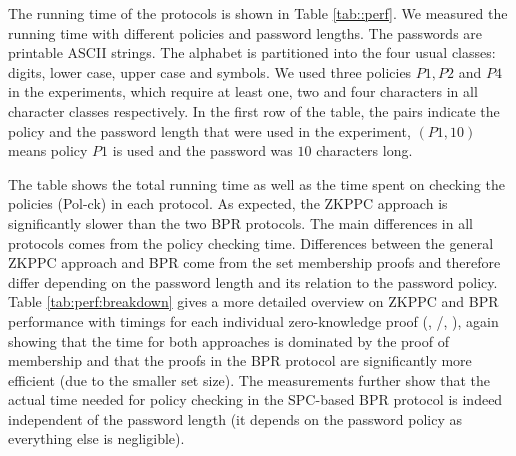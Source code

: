 \begin{table}[!t]
\begin{center}
\vspace*{1em}
\caption[BPR Protocol Performance]{Protocol Performance (Running Time in Milliseconds)} \label{tab::perf}
\end{center}
\end{table} 

The running time of the protocols is shown in Table \ref{tab::perf}. We measured the running time with different policies and password lengths. The passwords are printable \ac{ASCII} strings. 
The alphabet is partitioned into the four usual classes: digits, lower case, upper case and symbols. 
We used three policies $P1, P2$ and $P4$ in the experiments, which require at least one, two and four characters in all character classes respectively. 
In the first row of the table, the pairs indicate the policy and the password length that were used in the experiment, \eg $(P1, 10)$ means policy $P1$ is used and the password was $10$ characters long. 

The table shows the total running time as well as the time spent on checking the policies (Pol-ck) in each protocol. 
As expected, the \ac{ZKPPC} approach is significantly slower than the two \ac{BPR} protocols.
The main differences in all protocols comes from the policy checking time.
Differences between the general \ac{ZKPPC} approach and \ac{BPR} come from the set membership proofs and therefore differ depending on the password length and its relation to the password policy.
Table \ref{tab:perf:breakdown} gives a more detailed overview on \ac{ZKPPC} and \ac{BPR} performance with timings for each individual zero-knowledge proof (\PoM, \PoE/\PoC, \PoS), again showing that the time for both approaches is dominated by the proof of membership and that the \PoM proofs in the \ac{BPR} protocol are significantly more efficient (due to the smaller set size).
The measurements further show that the actual time needed for policy checking in the \ac{SPC}-based \ac{BPR} protocol is indeed independent of the password length (it depends on the password policy as everything else is negligible).

